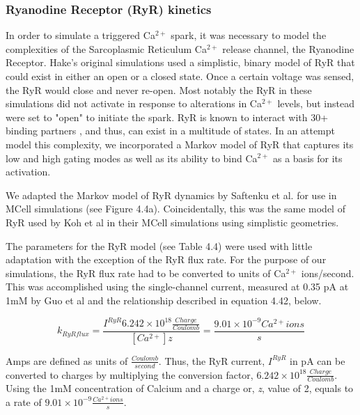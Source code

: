 \documentclass[12pt]{ucsddissertation}
\begin{document}
\subsubsection{Ryanodine Receptor (RyR) kinetics}

In order to simulate a triggered Ca$^{2+}$ spark, it was necessary to model the complexities of the Sarcoplasmic Reticulum Ca$^{2+}$ release channel, the Ryanodine Receptor. Hake's original simulations used a simplistic, binary model of RyR that could exist in either an open or a closed state. Once a certain voltage was sensed, the RyR would close and never re-open. Most notably the RyR in these simulations did not activate in response to alterations in Ca$^{2+}$ levels, but instead were set to "open" to initiate the spark. RyR is known to interact with 30+ binding partners \cite{Song2011}, and thus, can exist in a multitude of states. In an attempt model this complexity, we incorporated a Markov model of RyR that captures its low and high gating modes as well as its ability to bind Ca$^{2+}$ as a basis for its activation.

We adapted the Markov model of RyR dynamics by Saftenku et al. \cite{Saftenku2001} for use in MCell simulations (see Figure 4.4a). Coincidentally, this was the same model of RyR used by Koh et al in their MCell simulations using simplistic geometries\cite{Koh2006}. 

The parameters for the RyR model (see Table 4.4) were used with little adaptation with the exception of the RyR flux rate. For the purpose of our simulations, the RyR flux rate had to be converted to units of Ca$^{2+}$ ions/second. This was accomplished using the single-channel current, measured at 0.35 pA at 1mM by Guo et al \cite{Guo2012} and the relationship described in equation 4.42, below.

\begin{equation}
k_{RyRflux} = \frac {I^{RyR}6.242\times 10^{18}\frac{Charge}{Coulomb}}{\left[ Ca^{2+}\right] z} = \frac{9.01\times10^{-9}  Ca^{2+}ions}{s}
\end{equation}

Amps are defined as units of $\frac{Coulomb}{second}$. Thus, the RyR current, $I^{RyR}$ in pA can be converted to charges by multiplying the conversion factor, $6.242\times 10^{18}\frac{Charge}{Coulomb}$. Using the 1mM concentration of Calcium and a charge or, \textit{z}, value of 2, equals to a rate of $ 9.01\times10^{-9}\frac{ Ca^{2+}ions}{s}$.
\end{document}
